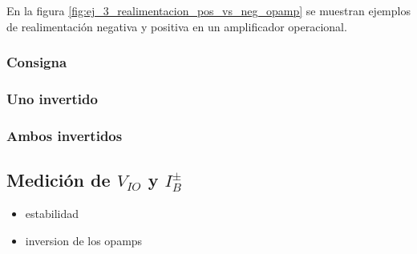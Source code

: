 \documentclass[../../main.tex]{subfiles}
\begin{document}
En la figura \ref{fig:ej_3_realimentacion_pos_vs_neg_opamp} se muestran ejemplos de realimentaci\'on negativa y positiva en un amplificador operacional.



\subsubsection{Consigna}
\subsubsection{Uno invertido}
\subsubsection{Ambos invertidos}












\subsection{Medici\'on de $V_{IO}$ y $I_B^\pm$}


\begin{itemize}
	\item estabilidad
	\item inversion de los opamps
\end{itemize}
\end{document}
